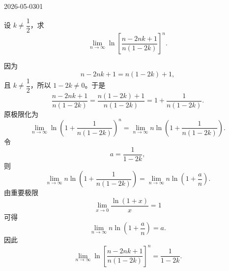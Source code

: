 \begin{mistake}{2026-05-03}{01}

\begin{problemcontent}
设 \(k\ne \dfrac12\)，求
\[
\lim_{n\to\infty}\ln\left[\frac{n-2nk+1}{n(1-2k)}\right]^n.
\]
\end{problemcontent}

\begin{solutioncontent}
因为
\[
n-2nk+1=n(1-2k)+1,
\]
且 \(k\ne \dfrac12\)，所以 \(1-2k\ne 0\)。于是
\[
\frac{n-2nk+1}{n(1-2k)}
=
\frac{n(1-2k)+1}{n(1-2k)}
=1+\frac{1}{n(1-2k)}.
\]
原极限化为
\[
\lim_{n\to\infty}\ln\left(1+\frac{1}{n(1-2k)}\right)^n
=
\lim_{n\to\infty}n\ln\left(1+\frac{1}{n(1-2k)}\right).
\]
令
\[
a=\frac{1}{1-2k},
\]
则
\[
\lim_{n\to\infty}n\ln\left(1+\frac{1}{n(1-2k)}\right)
=
\lim_{n\to\infty}n\ln\left(1+\frac{a}{n}\right).
\]
由重要极限
\[
\lim_{x\to 0}\frac{\ln(1+x)}{x}=1
\]
可得
\[
\lim_{n\to\infty}n\ln\left(1+\frac{a}{n}\right)=a.
\]
因此
\[
\boxed{\lim_{n\to\infty}\ln\left[\frac{n-2nk+1}{n(1-2k)}\right]^n=\frac{1}{1-2k}}.
\]
\end{solutioncontent}


\end{mistake}
